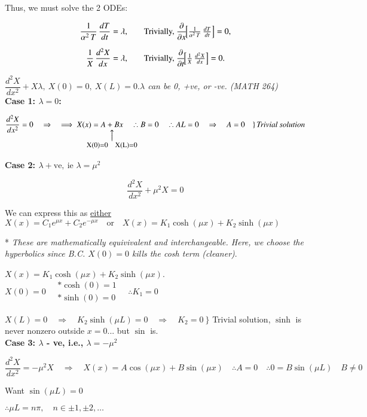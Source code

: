 \documentclass{report}
\makeatletter
\newcommand\parrow[3][3ex]{%
 \begin{array}[t]{@{}c@{}} #2 \\
  \left\uparrow\vcenter{\hrule height #1}\right.\kern-\nulldelimiterspace\\
  \makebox[0pt]{\small#3}
  \end{array}%
}
\makeatother
\begin{document}
Thus, we must solve the 2 ODEs:

\[
\begin{aligned}
\frac{1}{\alpha^2\,T}\,\frac{dT}{dt} &= \lambda,
& \quad & 
\text{Trivially,}\ 
\frac{\partial}{\partial x}\!\Bigl[\tfrac{1}{\alpha^2\,T}\,\tfrac{dT}{dt}\Bigr] = 0,\\[6pt]
\frac{1}{X}\,\frac{d^2X}{dx} &= \lambda,
& \quad &
\text{Trivially,}\ 
\frac{\partial}{\partial t}\!\Bigl[\tfrac{1}{X}\,\tfrac{d^2X}{dx}\Bigr] = 0.
\end{aligned}
\]

$\dfrac{d^2X}{dx^2} + X\lambda,\ X(0)=0,\ X(L)=0$.\quad \textit{$\lambda$ can be 0, +ve, or -ve. (MATH 264)}\\


\textbf{Case 1: $\lambda=0$:}

$$
\frac{d^2X}{dx^2} = 0\quad\Rightarrow\quad \implies X(x) = \parrow{A + Bx}{X(0)=0\quad X(L)=0}\quad\left. \therefore B=0\quad \therefore AL=0\quad\Rightarrow\quad A=0\quad\right\}\text{\textit{Trivial solution}}
$$

\textbf{Case 2: $\lambda +\text{ve},\ \text{ie } \lambda=\mu^2$}

$$
\frac{d^2X}{dx^2} + \mu^2 X = 0
$$

We can express this as \underline{either} $X(x) = C_1 e^{\mu x} + C_2 e^{-\mu x} \quad \text{or} \quad X(x) = K_1 \cosh(\mu x) + K_2 \sinh(\mu x)$

* \textit{These are mathematically equivivalent and interchangeable. Here, we choose the hyperbolics since B.C. $X(0)=0$ kills the cosh term (cleaner)}.

$X(x)=K_1\cosh(\mu x)+K_2\sinh(\mu x)$. $X(0)=0\quad \begin{array}{l}
    *\cosh(0)=1 \\
    *\sinh(0)=0 
\end{array} \quad \therefore K_1=0$

$X(L)=0\quad\Rightarrow\quad K_2\sinh(\mu L)=0\quad\Rightarrow\quad K_2=0\ \}$ Trivial solution, $\sinh$ is never nonzero outside $x=0$... but $\sin$ is.\\

\textbf{Case 3: $\lambda$ - ve, i.e., $\lambda = -\mu^2$}

$$
\frac{d^2X}{dx^2} = - \mu^2 X \quad\Rightarrow\quad X(x) = A \cos(\mu x) + B \sin(\mu x)\quad \therefore A=0\quad \therefore 0=B\sin(\mu L)\quad B\neq 0
$$

Want $\sin(\mu L)=0$

$\therefore \mu L=n\pi,\quad n\in \pm1,\pm 2,\ldots$
\end{document}
